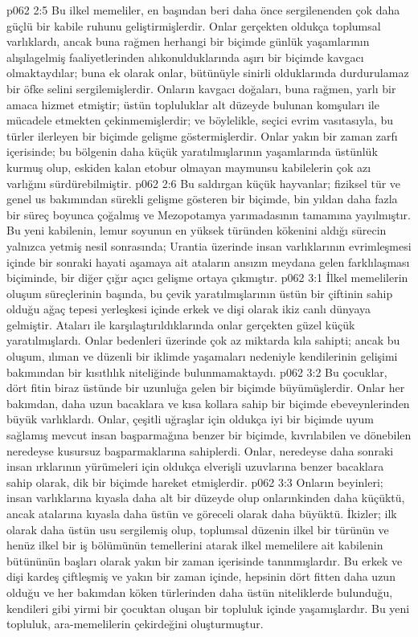 \vs p062 2:5 Bu ilkel memeliler, en başından beri daha önce sergilenenden çok daha güçlü bir kabile ruhunu geliştirmişlerdir. Onlar gerçekten oldukça toplumsal varlıklardı, ancak buna rağmen herhangi bir biçimde günlük yaşamlarının alışılagelmiş faaliyetlerinden alıkonulduklarında aşırı bir biçimde kavgacı olmaktaydılar; buna ek olarak onlar, bütünüyle sinirli olduklarında durdurulamaz bir öfke selini sergilemişlerdir. Onların kavgacı doğaları, buna rağmen, yarlı bir amaca hizmet etmiştir; üstün topluluklar alt düzeyde bulunan komşuları ile mücadele etmekten çekinmemişlerdir; ve böylelikle, seçici evrim vasıtasıyla, bu türler ilerleyen bir biçimde gelişme göstermişlerdir. Onlar yakın bir zaman zarfı içerisinde; bu bölgenin daha küçük yaratılmışlarının yaşamlarında üstünlük kurmuş olup, eskiden kalan etobur olmayan maymunsu kabilelerin çok azı varlığını sürdürebilmiştir.
\vs p062 2:6 Bu saldırgan küçük hayvanlar; fiziksel tür ve genel us bakımından sürekli gelişme gösteren bir biçimde, bin yıldan daha fazla bir süreç boyunca çoğalmış ve Mezopotamya yarımadasının tamamına yayılmıştır. Bu yeni kabilenin, lemur soyunun en yüksek türünden kökenini aldığı sürecin yalnızca yetmiş nesil sonrasında; Urantia üzerinde insan varlıklarının evrimleşmesi içinde bir sonraki hayati aşamaya ait ataların ansızın meydana gelen farklılaşması biçiminde, bir diğer çığır açıcı gelişme ortaya çıkmıştır.
\vs p062 3:1 İlkel memelilerin oluşum süreçlerinin başında, bu çevik yaratılmışlarının üstün bir çiftinin sahip olduğu ağaç tepesi yerleşkesi içinde erkek ve dişi olarak ikiz canlı dünyaya gelmiştir. Ataları ile karşılaştırıldıklarında onlar gerçekten güzel küçük yaratılmışlardı. Onlar bedenleri üzerinde çok az miktarda kıla sahipti; ancak bu oluşum, ılıman ve düzenli bir iklimde yaşamaları nedeniyle kendilerinin gelişimi bakımından bir kısıtlılık niteliğinde bulunmamaktaydı.
\vs p062 3:2 Bu çocuklar, dört fitin biraz üstünde bir uzunluğa gelen bir biçimde büyümüşlerdir. Onlar her bakımdan, daha uzun bacaklara ve kısa kollara sahip bir biçimde ebeveynlerinden büyük varlıklardı. Onlar, çeşitli uğraşlar için oldukça iyi bir biçimde uyum sağlamış mevcut insan başparmağına benzer bir biçimde, kıvrılabilen ve dönebilen neredeyse kusursuz başparmaklarına sahiplerdi. Onlar, neredeyse daha sonraki insan ırklarının yürümeleri için oldukça elverişli uzuvlarına benzer bacaklara sahip olarak, dik bir biçimde hareket etmişlerdir.
\vs p062 3:3 Onların beyinleri; insan varlıklarına kıyasla daha alt bir düzeyde olup onlarınkinden daha küçüktü, ancak atalarına kıyasla daha üstün ve göreceli olarak daha büyüktü. İkizler; ilk olarak daha üstün usu sergilemiş olup, toplumsal düzenin ilkel bir türünün ve henüz ilkel bir iş bölümünün temellerini atarak ilkel memelilere ait kabilenin bütününün başları olarak yakın bir zaman içerisinde tanınmışlardır. Bu erkek ve dişi kardeş çiftleşmiş ve yakın bir zaman içinde, hepsinin dört fitten daha uzun olduğu ve her bakımdan köken türlerinden daha üstün niteliklerde bulunduğu, kendileri gibi yirmi bir çocuktan oluşan bir topluluk içinde yaşamışlardır. Bu yeni topluluk, ara\hyp{}memelilerin çekirdeğini oluşturmuştur.
